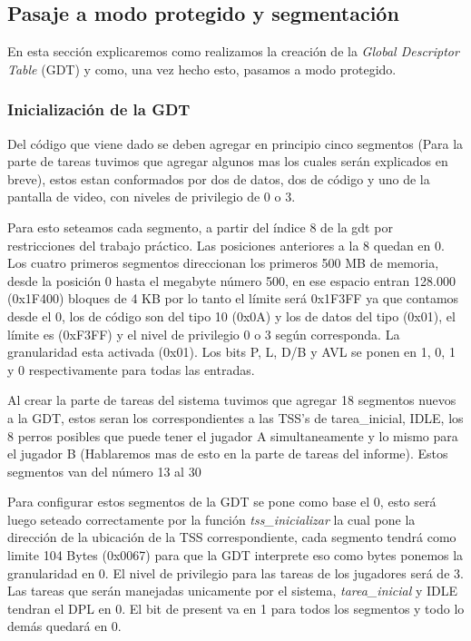 \subsection{Pasaje a modo protegido y segmentación}
En esta sección explicaremos como realizamos la creación de la \textit{Global Descriptor Table} (GDT) y como, una vez hecho esto, pasamos a modo protegido.

\subsubsection{Inicialización de la GDT}
Del código que viene dado se deben agregar en principio cinco segmentos (Para la parte de tareas tuvimos que agregar algunos mas los cuales serán explicados en breve), estos estan conformados por dos de datos, dos de código y uno de la pantalla de video, con niveles de privilegio de 0 o 3.

Para esto seteamos cada segmento, a partir del índice 8 de la gdt por restricciones del trabajo práctico. Las posiciones anteriores a la 8 quedan en 0. Los cuatro primeros segmentos direccionan los primeros 500 MB de memoria, desde la posición 0 hasta el megabyte número 500, en ese espacio entran 128.000 (0x1F400) bloques de 4 KB por lo tanto el límite será 0x1F3FF ya que contamos desde el 0, los de código son del tipo 10 (0x0A) y los de datos del tipo (0x01), el límite es (0xF3FF) y el nivel de privilegio 0 o 3 según corresponda. La granularidad esta activada (0x01). Los bits P, L, D/B y AVL se ponen en 1, 0, 1 y 0 respectivamente para todas las entradas.

Al crear la parte de tareas del sistema tuvimos que agregar 18 segmentos nuevos a la GDT, estos seran los correspondientes a las TSS's de tarea\_inicial, IDLE, los 8 perros posibles que puede tener el jugador A simultaneamente y lo mismo para el jugador B (Hablaremos mas de esto en la parte de tareas del informe). Estos segmentos van del número 13 al 30

Para configurar estos segmentos de la GDT se pone como base el 0, esto será luego seteado correctamente por la función \textit{tss\_inicializar} la cual pone la dirección de la ubicación de la TSS correspondiente, cada segmento tendrá como limite 104 Bytes (0x0067) para que la GDT interprete eso como bytes ponemos la granularidad en 0. El nivel de privilegio para las tareas de los jugadores será de 3. Las tareas que serán manejadas unicamente por el sistema, \textit{tarea\_inicial} y IDLE tendran el DPL en 0. El bit de present va en 1 para todos los segmentos y todo lo demás quedará en 0. 

